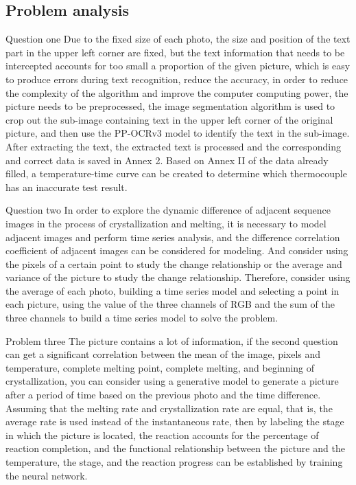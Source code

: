 \documentclass[12pt]{apmcmthesis}
\begin{document}
\subsection{Problem analysis}
Question one  Due to the fixed size of each photo, the size and position of the text part in the upper left corner are fixed, but the text information that needs to be intercepted accounts for too small a proportion of the given picture, which is easy to produce errors during text recognition, reduce the accuracy, in order to reduce the complexity of the algorithm and improve the computer computing power, the picture needs to be preprocessed, the image segmentation algorithm is used to crop out the sub-image containing text in the upper left corner of the original picture, and then use the PP-OCRv3 model to identify the text in the sub-image. After extracting the text, the extracted text is processed and the corresponding and correct data is saved in Annex 2. Based on Annex II of the data already filled, a temperature-time curve can be created to determine which thermocouple has an inaccurate test result.

Question two  In order to explore the dynamic difference of adjacent sequence images in the process of crystallization and melting, it is necessary to model adjacent images and perform time series analysis, and the difference correlation coefficient of adjacent images can be considered for modeling. And consider using the pixels of a certain point to study the change relationship or the average and variance of the picture to study the change relationship. Therefore, consider using the average of each photo, building a time series model and selecting a point in each picture, using the value of the three channels of RGB and the sum of the three channels to build a time series model to solve the problem.

Problem three  The picture contains a lot of information, if the second question can get a significant correlation between the mean of the image, pixels and temperature, complete melting point, complete melting, and beginning of crystallization, you can consider using a generative model to generate a picture after a period of time based on the previous photo and the time difference. Assuming that the melting rate and crystallization rate are equal, that is, the average rate is used instead of the instantaneous rate, then by labeling the stage in which the picture is located, the reaction accounts for the percentage of reaction completion, and the functional relationship between the picture and the temperature, the stage, and the reaction progress can be established by training the neural network.
\end{document}

